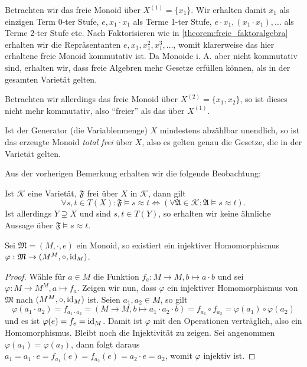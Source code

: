 \begin{remark}
    Betrachten wir das freie Monoid über $X^{(1)} = \{x_1\}$. Wir erhalten damit $x_1$ als einzigen Term 0-ter Stufe, $e, x_1 \cdot x_1$ als Terme 1-ter Stufe, $e \cdot x_1, (x_1 \cdot x_1), \ldots$ als Terme 2-ter Stufe etc. Nach Faktorisieren wie in \cref{theorem:freie_faktoralgebra} erhalten wir die Repräsentanten $e, x_1, x_1^2, x_1^3, \ldots$, womit klarerweise das hier erhaltene freie Monoid kommutativ ist. Da Monoide i. A. aber nicht kommutativ sind, erhalten wir, dass freie Algebren mehr Gesetze erfüllen können, als in der gesamten Varietät gelten. 
    
    Betrachten wir allerdings das freie Monoid über $X^{(2)} = \{x_1, x_2\}$, so ist dieses nicht mehr kommutativ, also ``freier'' als das über $X^{(1)}$. 

    Ist der Generator (die Variablenmenge) $X$ mindestens abzählbar unendlich, so ist das erzeugte Monoid \emph{total frei} über $X$, also es gelten genau die Gesetze, die in der Varietät gelten.
\end{remark}

\begin{remark}
    Aus der vorherigen Bemerkung erhalten wir die folgende Beobachtung:

    Ist $\mathcal{K}$ eine Varietät, $\mathfrak{F}$ frei über $X$ in $\mathcal{K}$, dann gilt $$\forall s,t \in T(X): \mathfrak{F} \models s\approx t \Leftrightarrow \left(\forall \mathfrak{A} \in \mathcal{K}: \mathfrak{A} \models s \approx t\right).$$ 
    Ist allerdings $Y \supsetneq X$ und sind $s,t \in T(Y)$, so erhalten wir keine ähnliche Aussage über $\mathfrak{F} \models s \approx t$.
\end{remark}

\begin{theorem}\label{theorem:darstellungssatz-cayley-monoid}
    Sei $\mathfrak{M} = (M, \cdot, e)$ ein Monoid, so existiert ein injektiver Homomorphismus $\varphi: \mathfrak{M} \to (M^M, \circ, \operatorname{id}_M)$.
\end{theorem}
\begin{proof}
    Wähle für $a \in M$ die Funktion $f_a: M \to M, b \mapsto a \cdot b$ und sei $\varphi: M \to M^M, a \mapsto f_a$. Zeigen wir nun, dass $\varphi$ ein injektiver Homomorphismus von $\mathfrak{M}$ nach $(M^M, \circ, \operatorname{id}_M)$ ist. Seien $a_1, a_2 \in M$, so gilt $$\varphi(a_1 \cdot a_2) = f_{a_1 \cdot a_2} = (M \to M, b \mapsto a_1 \cdot a_2 \cdot b) = f_{a_1} \circ f_{a_2} = \varphi(a_1) \circ \varphi(a_2)$$
    und es ist $\varphi(e) = f_e = \operatorname{id}_M$. Damit ist $\varphi$ mit den Operationen verträglich, also ein Homomorphismus. Bleibt noch die Injektivität zu zeigen. Sei angenommen $\varphi(a_1) = \varphi(a_2)$, dann folgt daraus $a_1 = a_1 \cdot e = f_{a_1}(e) = f_{a_2}(e) = a_2 \cdot e = a_2$, womit $\varphi$ injektiv ist.
\end{proof}

